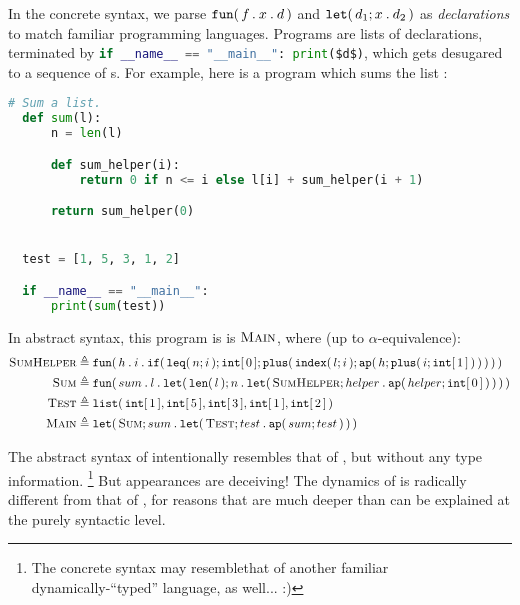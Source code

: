 \documentclass[11pt]{article}
\begin{document}
In the concrete syntax, we parse $\dfunabt{f}{x}{d}$ and $\dletabt{d_1}{x}{d_2}$ as \emph{declarations} to match familiar programming languages.
Programs are lists of declarations, terminated by \lstinline[language=Python,mathescape=true]|if __name__ == "__main__": print($d$)|, which gets desugared to a sequence of s.
For example, here is a program which sums the list \code{[1, 5, 3, 1, 2]}:

\begin{lstlisting}[language=Python]
  # Sum a list.
  def sum(l):
      n = len(l)

      def sum_helper(i):
          return 0 if n <= i else l[i] + sum_helper(i + 1)

      return sum_helper(0)


  test = [1, 5, 3, 1, 2]

  if __name__ == "__main__":
      print(sum(test))
\end{lstlisting}

In abstract syntax, this program is is $\textsc{Main}$, where (up to $\alpha$-equivalence):
\begin{align*}
  \textsc{SumHelper} &\isdef \dfunabt{h}{i}{\difabt{\dleqabt{n}{i}}{\dintabt{0}}{\dplusabt{\dindexabt{l}{i}}{\dappabt{h}{\dplusabt{i}{\dintabt{1}}}}}} \\
  \textsc{Sum} &\isdef \dfunabt{sum}{l}{\dletabt{\dlenabt{l}}{n}{\dletabt{\textsc{SumHelper}}{helper}{\dappabt{helper}{\dintabt{0}}}}} \\
  \textsc{Test} &\isdef \dlistabt{\dintabt{1}, \dintabt{5}, \dintabt{3},\dintabt{1}, \dintabt{2}} \\
  \textsc{Main} &\isdef \dletabt{\textsc{Sum}}{sum}{\dletabt{\textsc{Test}}{test}{\dappabt{sum}{test}}}
\end{align*}

The abstract syntax of \LangPyCF{} intentionally resembles that of \LangPCF{}, but without any type information.%
\footnote{The concrete syntax may resemble\footnotemark that of another familiar dynamically-``typed'' language, as well... :)}%
But appearances are deceiving!
The dynamics of \LangPyCF{} is radically different from that of \LangPCF{}, for reasons that are much deeper than can be explained at the purely syntactic level.
\end{document}
